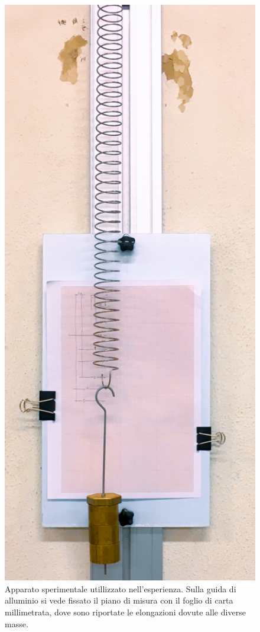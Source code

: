 \documentclass[italian, a4paper, 10pt, twocolumn]{../../style/lab_unige}
\begin{document}
    \begin{figure}
        \centering
        \includegraphics[width=0.8\linewidth]{IMG_0242.JPG}
        \caption{Apparato sperimentale utillizzato nell'esperienza. Sulla guida di alluminio si vede fissato il
        piano di misura con il foglio di carta millimetrata, dove sono riportate le elongazioni dovute alle 
        diverse masse.}
        \label{figure:apparatus}
    \end{figure}
\end{document}
